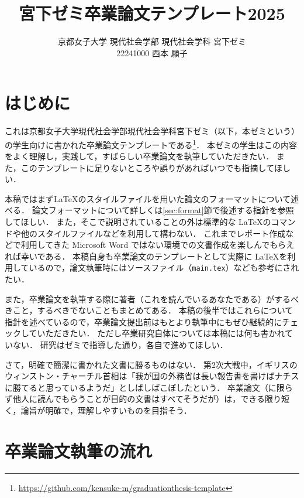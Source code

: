 \documentclass[a4paper,twocolumn,10pt]{jsarticle}
\title{宮下ゼミ卒業論文テンプレート2025}
\author{京都女子大学 現代社会学部 現代社会学科 宮下ゼミ\\
22241000 西本 願子}
\begin{document}
\maketitle

\section{はじめに}
\label{sec:hajimeni}

これは京都女子大学現代社会学部現代社会学科宮下ゼミ（以下，本ゼミという）の学生向けに書かれた卒業論文テンプレートである\footnote{\url{https://github.com/kensuke-m/graduationthesis-template}}．
本ゼミの学生はこの内容をよく理解し，実践して，すばらしい卒業論文を執筆していただきたい．
また，このテンプレートに足りないところや誤りがあればいつでも指摘してほしい．

本稿ではまず\LaTeX のスタイルファイルを用いた論文のフォーマットについて述べる．
論文フォーマットについて詳しくは\ref{sec:format}節で後述する指針を参照してほしい．
また，そこで説明されていることの外は標準的な \LaTeX のコマンドや他のスタイルファイルなどを利用して構わない．
これまでレポート作成などで利用してきた Microsoft Word ではない環境での文書作成を楽しんでもらえれば幸いである．
本稿自身も卒業論文のテンプレートとして実際に \LaTeX を利用しているので，論文執筆時にはソースファイル（{\tt main.tex}）なども参考にされたい．

また，卒業論文を執筆する際に著者（これを読んでいるあなたである）がするべきこと，するべきでないこともまとめてある．
本稿の後半ではこれらについて指針を述べているので，卒業論文提出前はもとより執筆中にもぜひ継続的にチェックしていただきたい．
ただし卒業研究自体については本稿には何も書かれていない．
研究はゼミで指導した通り，各自で進めてほしい．

さて，明確で簡潔に書かれた文書に勝るものはない．
第2次大戦中，イギリスのウィンストン・チャーチル首相は「我が国の外務省は長い報告書を書けばナチスに勝てると思っているようだ」としばしばこぼしたという\cite{newsweek2021}．
卒業論文（に限らず他人に読んでもらうことが目的の文書はすべてそうだが）は，できる限り短く，論旨が明確で，理解しやすいものを目指そう．

\section{卒業論文執筆の流れ}
\end{document}
